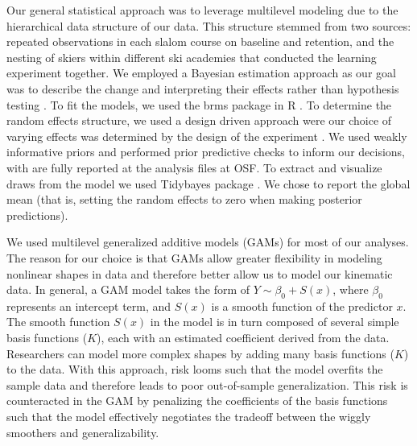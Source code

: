 \documentclass{article}
\begin{document}
Our general statistical approach was to leverage multilevel modeling due to the hierarchical data structure of our data. This structure stemmed from two sources: repeated observations in each slalom course on baseline and retention, and the nesting of skiers within different ski academies that conducted the learning experiment together. We employed a Bayesian estimation approach as our goal was to describe the change and interpreting their effects rather than hypothesis testing \cite{kruschke_bayesian_2018}. To fit the models, we used the brms \cite{burkner_brms_2017} package in R \cite{r_core_team_r_2022}. To determine the random effects structure, we used a design driven approach were our choice of varying effects was determined by the design of the experiment \cite{barr_learning_2021, barr_random_2013}. We used weakly informative priors and performed prior predictive checks to inform our decisions, with are fully reported at the analysis files at OSF. To extract and visualize draws from the model we used Tidybayes package \cite{kay_tidybayes_nodate}. We chose to report the global mean (that is, setting the random effects to zero when making posterior predictions). 

We used multilevel generalized additive models (GAMs) \cite{pedersen_hierarchical_2019, wood_generalized_2017} for most of our analyses. The reason for our choice is that GAMs allow greater flexibility in modeling nonlinear shapes in data and therefore better allow us to model our kinematic data. In general, a GAM model takes the form of $Y \sim \beta_0 + S(x)$, where $\beta_0$ represents an intercept term, and $S(x)$ is a smooth function of the predictor $x$. The smooth function $S(x)$ in the model is in turn composed of several simple basis functions ($K$), each with an estimated coefficient derived from the data. Researchers can model more complex shapes by adding many basis functions ($K$) to the data. With this approach, risk looms such that the model overfits the sample data and therefore leads to poor out-of-sample generalization. This risk is counteracted in the GAM by penalizing the coefficients of the basis functions such that the model effectively negotiates the tradeoff between the wiggly smoothers and generalizability. 
\end{document}
